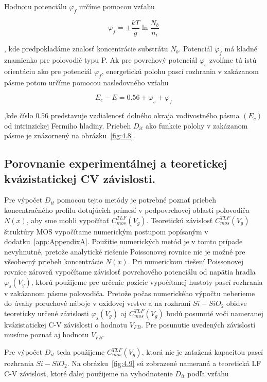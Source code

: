 Hodnotu potenciálu $\varphi_{f}$ určíme pomocou vzťahu

\begin{equation}\label{eq:4.16}
  \varphi_{f} = \pm \frac{kT}{g} \ln{\frac{N_{b}}{n_{i}}}
\end{equation}

, kde predpokladáme znalosť koncentrácie substrátu $N_{b}$. Potenciál
$\varphi_{f}$ má kladné znamienko pre polovodič typu P. Ak pre
povrchový potenciál $\varphi_{s}$ zvolíme tú istú orientáciu ako pre
potenciál $\varphi_{f}$, energetickú polohu pascí rozhrania v
zakázanom pásme potom určíme pomocou nasledovného vzťahu

\begin{equation}\label{eq:4.17}
  E_{c} - E = 0.56 + \varphi_{s} + \varphi_{f}
\end{equation}

,kde číslo $0.56$ predstavuje vzdialenosť dolného okraja vodivostného
pásma $(E_{c})$ od intrinzickej Fermiho hladiny. Priebeh $D_{it}$ ako
funkcie polohy v zakázanom pásme je znázornený na
obrázku~\ref{fig:4.8}.

\subsection{Porovnanie experimentálnej a teoretickej kvázistatickej CV závislosti.}\label{sec:4.2.2}

Pre výpočet $D_{it}$ pomocou tejto metódy je potrebné poznať priebeh
koncentračného profilu dotujúcich prímesí v podpovrchovej oblasti
polovodiča $N(x)$, aby sme mohli vypočítať
$C_{mos}^{TLF}(V_{g})$. Teoretickú závislosť $C_{mos}^{TLF}(V_{g})$
štruktúry MOS vypočítame numerickým postupom popísaným v
dodatku~\ref{app:AppendixA}.  Použitie numerických metód je v tomto
prípade nevyhnutné, pretože analytické riešenie Poissonovej rovnice
nie je možné pre všeobecný priebeh koncentrácie $N(x)$.  Pri
numerickom riešení Poissonovej rovnice zároveň vypočítame závislosť
povrchového potenciálu od napätia hradla $\varphi_{s}(V_{g})$, ktorú
použijeme pre určenie pozície vypočítanej hustoty pascí rozhrania v
zakázanom pásme polovodiča.  Pretože počas numerického výpočtu
neberieme do úvahy poruchové náboje v oxidovej vrstve a na rozhraní
$Si-SiO_{2}$ obidve teoreticky určené závislosti $\varphi_{s}(V_{g})$
aj $C_{mos}^{TLF}(V_{g})$ budú posunuté voči nameranej kvázistatickej
C-V závislosti o hodnotu $V_{FB}$. Pre posunutie uvedených závislostí
musíme poznať aj hodnotu $V_{FB}$.

\par Pre výpočet $D_{it}$ teda použijeme $C_{mos}^{TLF}(V_{g})$, ktorá
nie je zaťažená kapacitou pascí rozhrania $Si-SiO_{2}$. Na
obrázku~\ref{fig:4.9} sú zobrazené nameraná a teoretická LF C-V
závislosť, ktoré ďalej použijeme na vyhodnotenie $D_{it}$ podľa
vzťahu

